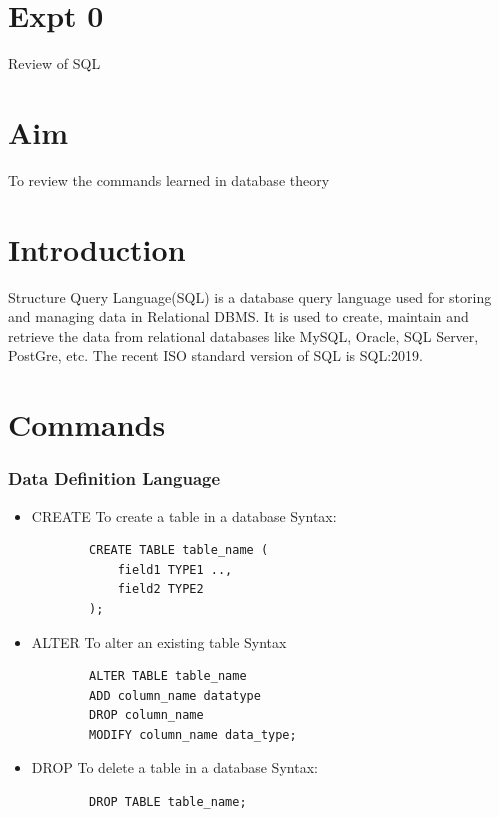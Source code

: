 \documentclass{article}
\begin{document}
\section*{Expt 0}
\begin{center}
    \Large{Review of SQL}
\end{center}

\section{Aim}
\large{To review the commands learned in database theory}

\section{Introduction}
\large Structure Query Language(SQL) is a database query language used for storing and managing data in Relational DBMS. It is used to create, maintain and retrieve the data from relational databases like MySQL, Oracle, SQL Server, PostGre, etc. The recent ISO standard version of SQL is SQL:2019.
\section{Commands}
\subsubsection{Data Definition Language}
\begin{itemize}
    \item {CREATE}\newline
    To create a table in a database\newline
    Syntax: 
    \begin{verbatim}
        CREATE TABLE table_name (
            field1 TYPE1 ..,
            field2 TYPE2
        );
    \end{verbatim}
    
    
    \item ALTER
    \newline To alter an existing table
    \newline Syntax
    \begin{verbatim}
        ALTER TABLE table_name
        ADD column_name datatype
        DROP column_name
        MODIFY column_name data_type;
    \end{verbatim}
    
    \item {DROP}\newline
    To delete a table in a database\newline
    Syntax: 
    \begin{verbatim}
        DROP TABLE table_name;
    \end{verbatim}
\end{itemize}
\end{document}
